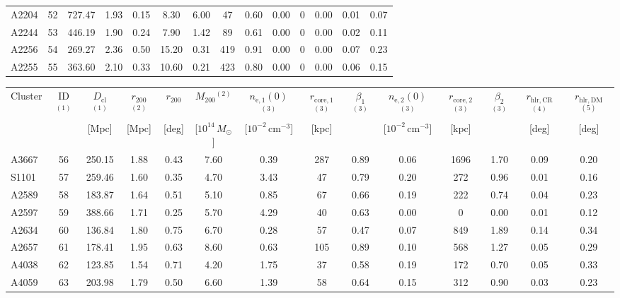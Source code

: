 \documentclass[10pt,aps,pra,reprint,amsmath,amsfonts,amssymb,showpacs,nofootinbib,floatfix]{revtex4-1}
\newcommand{\rmn}{\mathrm}
\newcommand{\clu}{\rmn{cl}}
\newcommand{\msun}{M_\odot}
\newcommand{\vst}{\vspace{-0.14mm}}
\newcommand{\rvir}{r_{200}}
\newcommand{\mvir}{M_{200}}
\begin{document}
{\begin{table}
\begin{minipage}{2.0\columnwidth}
\begin{tabular}{l c c c c c c c c c c c c c}
A2204 & 52 & 727.47 & 1.93 & 0.15 & 8.30 & 6.00 & 47 & 0.60 & 0.00 & 0 & 0.00 & 0.01 & 0.07 \vst \\
A2244 & 53 & 446.19 & 1.90 & 0.24 & 7.90 & 1.42 & 89 & 0.61 & 0.00 & 0 & 0.00 & 0.02 & 0.11 \vst \\
A2256 & 54 & 269.27 & 2.36 & 0.50 & 15.20 & 0.31 & 419 & 0.91 & 0.00 & 0 & 0.00 & 0.07 & 0.23 \vst \\
A2255 & 55 & 363.60 & 2.10 & 0.33 & 10.60 & 0.21 & 423 & 0.80 & 0.00 & 0 & 0.00 & 0.06 & 0.15 \vst \\
\end{tabular}
 \label{tab:flux_tab_CLp}
\end{minipage}
\end{table}
\newpage
\begin{table}
\begin{minipage}{2.0\columnwidth}
\begin{tabular}{l c c c c c c c c c c c c c}
\hline
\hline
Cluster & ID$^{(1)}$ & $D_\clu$$^{(1)}$ & $\rvir$$^{(2)}$ & $\rvir$ &
$\mvir$$^{(2)}$ & $n_\rmn{e,1}(0)$$^{(3)}$ & $r_\rmn{core,1}$$^{(3)}$ &
$\beta_1$$^{(3)}$ & $n_\rmn{e,2}(0)$$^{(3)}$ & $r_\rmn{core,2}$$^{(3)}$ &
$\beta_2$$^{(3)}$ & $r_\rmn{hlr,CR}$$^{(4)}$ & $r_\rmn{hlr,DM}$ $^{(5)}$ \\
& & [Mpc] & [Mpc] & [deg] & [$10^{14}\,\msun$]
& [$10^{-2}\,\rmn{cm}^{-3}$] & [kpc] & &
  [$10^{-2}\,\rmn{cm}^{-3}$] & [kpc] & & [deg] & [deg] \\
 \hline
A3667 & 56 & 250.15 & 1.88 & 0.43 & 7.60 & 0.39 & 287 & 0.89 & 0.06 & 1696 & 1.70 & 0.09 & 0.20 \vst \\
S1101 & 57 & 259.46 & 1.60 & 0.35 & 4.70 & 3.43 & 47 & 0.79 & 0.20 & 272 & 0.96 & 0.01 & 0.16 \vst \\
A2589 & 58 & 183.87 & 1.64 & 0.51 & 5.10 & 0.85 & 67 & 0.66 & 0.19 & 222 & 0.74 & 0.04 & 0.23 \vst \\
A2597 & 59 & 388.66 & 1.71 & 0.25 & 5.70 & 4.29 & 40 & 0.63 & 0.00 & 0 & 0.00 & 0.01 & 0.12 \vst \\
A2634 & 60 & 136.84 & 1.80 & 0.75 & 6.70 & 0.28 & 57 & 0.47 & 0.07 & 849 & 1.89 & 0.14 & 0.34 \vst \\
A2657 & 61 & 178.41 & 1.95 & 0.63 & 8.60 & 0.63 & 105 & 0.89 & 0.10 & 568 & 1.27 & 0.05 & 0.29 \vst \\
A4038 & 62 & 123.85 & 1.54 & 0.71 & 4.20 & 1.75 & 37 & 0.58 & 0.19 & 172 & 0.70 & 0.05 & 0.33 \vst \\
A4059 & 63 & 203.98 & 1.79 & 0.50 & 6.60 & 1.39 & 58 & 0.64 & 0.15 & 312 & 0.90 & 0.03 & 0.23 \vst \\

\end{tabular}
\end{minipage}
\end{table}}
\end{document}

